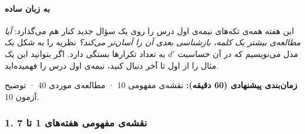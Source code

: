 \paragraph{به زبان ساده}

این هفته همه‌ی تکه‌های نیمه‌ی اول درس را روی یک سؤال جدید کنار هم می‌گذارد:
\emph{آیا مطالعه‌ی بیشتر یک کلمه، بازشناسی بعدی آن را آسان‌تر می‌کند؟}
نظریه را به شکل یک مدل  می‌نویسیم که در آن حساسیت \(d'\) به تعداد
تکرارها بستگی دارد. اگر بتوانید این یک مثال را از اول تا آخر دنبال کنید،
نیمه‌ی اول درس را فهمیده‌اید.

\textbf{زمان‌بندی پیشنهادی (60 دقیقه):} نقشه‌ی مفهومی 10 · مطالعه‌ی موردی
40 · توضیح آزمون 10.

\subsubsection{1. نقشه‌ی مفهومی هفته‌های 1 تا 7}

